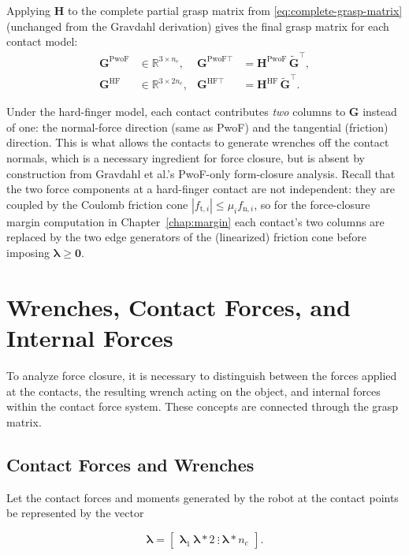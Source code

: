 Applying $\boldsymbol{H}$ to the complete partial grasp matrix from
\eqref{eq:complete-grasp-matrix} (unchanged from the Gravdahl derivation)
gives the final grasp matrix for each contact model:
\begin{align}
    \boldsymbol{G}^{\mathrm{PwoF}} &\in \mathbb{R}^{3 \times n_c} , &
    \boldsymbol{G}^{\mathrm{PwoF}\top} &= \boldsymbol{H}^{\mathrm{PwoF}}\,\tilde{\boldsymbol{G}}^\top ,
    \label{eq:G-pwof-nc}\\
    \boldsymbol{G}^{\mathrm{HF}} &\in \mathbb{R}^{3 \times 2n_c} , &
    \boldsymbol{G}^{\mathrm{HF}\top} &= \boldsymbol{H}^{\mathrm{HF}}\,\tilde{\boldsymbol{G}}^\top .
    \label{eq:G-hf-nc}
\end{align}

Under the hard-finger model, each contact contributes \emph{two} columns to
$\boldsymbol{G}$ instead of one: the normal-force direction (same as PwoF)
and the tangential (friction) direction. This is what allows the contacts to
generate wrenches off the contact normals, which is a necessary ingredient
for force closure, but is absent by construction from
Gravdahl et al.'s PwoF-only form-closure analysis. Recall that the two force
components at a hard-finger contact are not independent: they are coupled by
the Coulomb friction cone $|f_{\mathrm{t},i}| \le \mu_i f_{\mathrm{n},i}$, so
for the force-closure margin computation in
Chapter~\ref{chap:margin} each contact's two columns are replaced by the two
edge generators of the (linearized) friction cone before imposing
$\boldsymbol{\lambda} \ge \boldsymbol{0}$.

\section{Wrenches, Contact Forces, and Internal Forces}

To analyze force closure, it is necessary to distinguish between the forces applied at the contacts, the resulting wrench acting on the object, and internal forces within the contact force system. These concepts are connected through the grasp matrix.

\subsection{Contact Forces and Wrenches}

Let the contact forces and moments generated by the robot at the contact points be represented by the vector

\begin{equation}
\boldsymbol{\lambda}
=
\begin{bmatrix}
\boldsymbol{\lambda}_1 \
\boldsymbol{\lambda}*2 \
\vdots \
\boldsymbol{\lambda}*{n_c}
\end{bmatrix}.
\end{equation}

